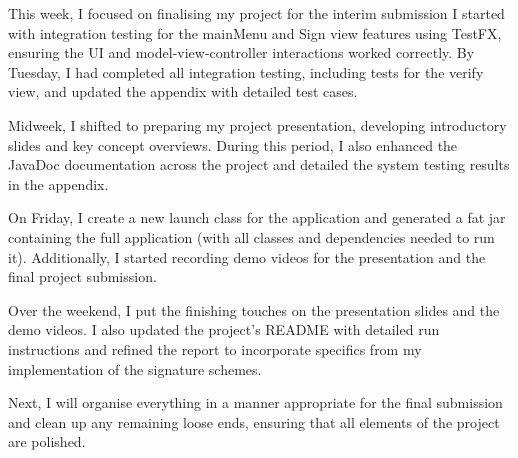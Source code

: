 \documentclass[]{final_report}
\theoremstyle{definition}
\begin{document}
This week, I focused on finalising my project for the interim submission I started with integration
testing for the mainMenu and Sign view features using TestFX, ensuring the UI and
model-view-controller interactions worked correctly. By Tuesday, I had completed all integration
testing, including tests for the verify view, and updated the appendix with detailed test cases.

Midweek, I shifted to preparing my project presentation, developing introductory slides and key
concept overviews. During this period, I also enhanced the JavaDoc documentation across the project
and detailed the system testing results in the appendix.

On Friday, I create a new launch class for the application and generated a fat jar containing the
full application (with all classes and dependencies needed to run it). Additionally, I started
recording demo videos for the presentation and the final project submission.

Over the weekend, I put the finishing touches on the presentation slides and the demo videos. I also
updated the project's README with detailed run instructions and refined the report to incorporate
specifics from my implementation of the signature schemes.

Next, I will organise everything in a manner appropriate for the final submission and clean up any
remaining loose ends, ensuring that all elements of the project are polished.
\newpage

\printbibliography
\label{endpage}
\end{document}
